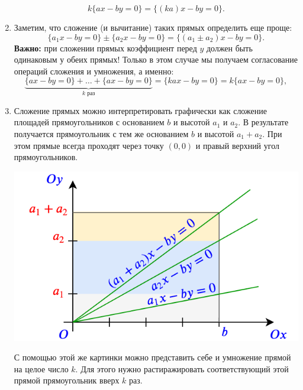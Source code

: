 \begin{enumerate}
$$
k\{ax-by=0\} = \{(ka)x-by=0\}.
$$
\item Заметим, что сложение (и вычитание) таких прямых определить еще проще: 
$$
\{a_1x-by=0\}\pm\{a_2x-by=0\} = \{(a_1\pm a_2)x-by=0\}.
$$
\textbf{Важно:} при сложении прямых коэффициент перед $y$ должен быть одинаковым у обеих прямых!
Только в этом случае мы получаем согласование операций сложения и умножения, а именно:
$$
\underbrace{\{ax-by=0\}+\dots+\{ax-by=0\}}_{k\mbox{ раз}} = \{kax-by=0\} = k\{ax-by=0\},
$$
\item Сложение прямых можно интерпретировать графически как сложение площадей прямоугольников с основанием $b$ и высотой $a_1$ и $a_2$. В результате получается прямоугольник с тем же основанием $b$ и высотой $a_1+a_2$. При этом прямые всегда проходят через точку $(0,0)$ и правый верхний угол прямоугольников.
\begin{center}
\includegraphics[scale=0.5]{linesum.png}
\end{center}
С помощью этой же картинки можно представить себе и умножение прямой на целое число $k$. Для этого нужно растиражировать соответствующий этой прямой прямоугольник вверх $k$ раз.


\end{enumerate}
